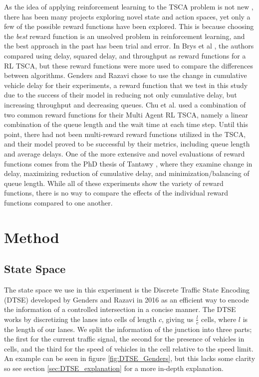 \documentclass[12pt,twocolumn]{article}
\begin{document}
As the idea of applying reinforcement learning to the TSCA problem is not new \cite{Thorpe}, there has been many projects exploring novel state and action spaces, yet only a few of the possible reward functions have been explored. This is because choosing the \emph{best} reward function is an unsolved problem in reinforcement learning, and the best approach in the past has been trial and error. In Brys et al \cite{Brys2014}, the authors compared using delay, squared delay, and throughput as reward functions for a RL TSCA, but these reward functions were more used to compare the differences between algorithms. Genders and Razavi \cite{Genders} chose to use the change in cumulative vehicle delay for their experiments, a reward function that we test in this study due to the success of their model in reducing not only cumulative delay, but increasing throughput and decreasing queues. Chu et al. \cite{Chu} used a combination of two common reward functions for their Multi Agent RL TSCA, namely a linear combination of the queue length and the wait time at each time step. Until this point, there had not been multi-reward reward functions utilized in the TSCA, and their model proved to be successful by their metrics, including queue length and average delays. One of the more extensive and novel evaluations of reward functions comes from the PhD thesis of Tantawy \cite{Tantawy}, where they examine change in delay, maximizing reduction of cumulative delay, and minimization/balancing of queue length. While all of these experiments show the variety of reward functions, there is no way to compare the effects of the individual reward functions compared to one another.

\section{Method}

\subsection{State Space}
The state space we use in this experiment is the Discrete Traffic State Encoding (DTSE) developed by Genders and Razavi in 2016 \cite{Genders} as an efficient way to encode the information of a controlled intersection in a concise manner. The DTSE works by discretizing the lanes into cells of length \(c\), giving us \(\frac{l}{c}\) cells, where \(l\) is the length of our lanes. We split the information of the junction into three parts; the first for the current traffic signal, the second for the presence of vehicles in cells, and the third for the speed of vehicles in the cell relative to the speed limit. An example can be seen in figure \ref{fig:DTSE_Genders}, but this lacks some clarity so see section \ref{sec:DTSE_explanation} for a more in-depth explanation.
\end{document}
